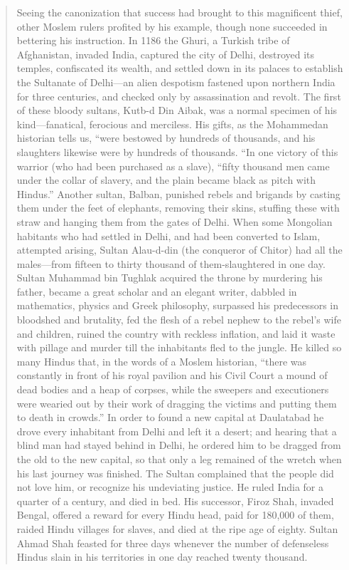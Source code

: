 \begin{quote}
Seeing the canonization that success had brought to this magnificent thief, other Moslem rulers profited by his example, though none succeeded in bettering his instruction. In 1186 the Ghuri, a Turkish tribe of Afghanistan, invaded India, captured the city of Delhi, destroyed its temples, confiscated its wealth, and settled down in its palaces to establish the Sultanate of Delhi—an alien despotism fastened upon northern India for three centuries, and checked only by assassination and revolt. The first of these bloody sultans, Kutb-d Din Aibak, was a normal specimen of his kind—fanatical, ferocious and merciless. His gifts, as the Mohammedan historian tells us, “were bestowed by hundreds of thousands, and his slaughters likewise were by hundreds of thousands. “In one victory of this warrior (who had been purchased as a slave), “fifty thousand men came under the collar of slavery, and the plain became black as pitch with Hindus.” Another sultan, Balban, punished rebels and brigands by casting them under the feet of elephants, removing their skins, stuffing these with straw and hanging them from the gates of Delhi. When some Mongolian habitants who had settled in Delhi, and had been converted to Islam, attempted arising, Sultan Alau-d-din (the conqueror of Chitor) had all the males—from fifteen to thirty thousand of them-slaughtered in one day. Sultan Muhammad bin Tughlak acquired the throne by murdering his father, became a great scholar and an elegant writer, dabbled in mathematics, physics and Greek philosophy, surpassed his predecessors in bloodshed and brutality, fed the flesh of a rebel nephew to the rebel’s wife and children, ruined the country with reckless inflation, and laid it waste with pillage and murder till the inhabitants fled to the jungle. He killed so many Hindus that, in the words of a Moslem historian, “there was constantly in front of his royal pavilion and his Civil Court a mound of dead bodies and a heap of corpses, while the sweepers and executioners were wearied out by their work of dragging the victims and putting them to death in crowds.” In order to found a new capital at Daulatabad he drove every inhabitant from Delhi and left it a desert; and hearing that a blind man had stayed behind in Delhi, he ordered him to be dragged from the old to the new capital, so that only a leg remained of the wretch when his last journey was finished. The Sultan complained that the people did not love him, or recognize his undeviating justice. He ruled India for a quarter of a century, and died in bed. His successor, Firoz Shah, invaded Bengal, offered a reward for every Hindu head, paid for 180,000 of them, raided Hindu villages for slaves, and died at the ripe age of eighty. Sultan Ahmad Shah feasted for three days whenever the number of defenseless Hindus slain in his territories in one day reached twenty thousand.


\end{quote}
